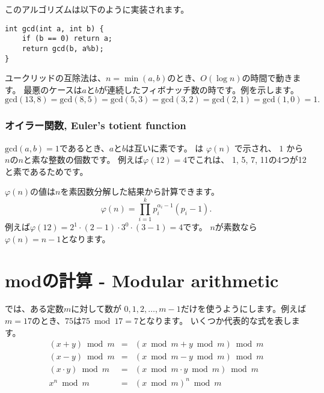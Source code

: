 このアルゴリズムは以下のように実装されます。
\begin{lstlisting}
int gcd(int a, int b) {
    if (b == 0) return a;
    return gcd(b, a%b);
}
\end{lstlisting}

ユークリッドの互除法は、$n=\min(a,b)$のとき、$O(\log n)$の時間で動きます。
最悪のケースは$a$と$b$が連続したフィボナッチ数の時です。例を示します。
\[\textrm{gcd}(13,8)=\textrm{gcd}(8,5)
=\textrm{gcd}(5,3)=\textrm{gcd}(3,2)=\textrm{gcd}(2,1)=\textrm{gcd}(1,0)=1.\]

\subsubsection{オイラー関数, Euler's totient function}


$\textrm{gcd}(a,b)=1$であるとき、$a$と$b$は互いに素です。
は
$\varphi(n)$ で示され、
$1$ から $n$の$n$と素な整数の個数です。
例えば$\varphi(12)=4$でこれは、
1, 5, 7, 11の4つが12と素であるためです。

$\varphi(n)$の値は$n$を素因数分解した結果から計算できます。
\[ \varphi(n) = \prod_{i=1}^k p_i^{\alpha_i-1}(p_i-1). \]
例えば$\varphi(12)=2^1 \cdot (2-1) \cdot 3^0 \cdot (3-1)=4$です。
$n$が素数なら$\varphi(n)=n-1$となります。

\section{modの計算 - Modular arithmetic}


では、ある定数$m$に対して数が
$0,1,2,\ldots,m-1$だけを使うようにします。例えば$m=17$のとき、$75$は$75 \bmod 17 = 7$となります。
いくつか代表的な式を表します。
\[
\begin{array}{rcl}
(x+y) \bmod m & = & (x \bmod m + y \bmod m) \bmod m \\
(x-y) \bmod m & = & (x \bmod m - y \bmod m) \bmod m \\
(x \cdot y) \bmod m & = & (x \bmod m \cdot y \bmod m) \bmod m \\
x^n \bmod m & = & (x \bmod m)^n \bmod m \\
\end{array}
\]


